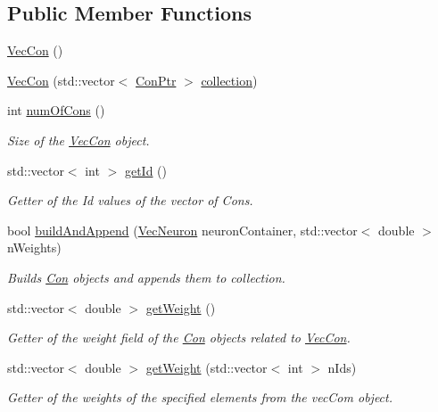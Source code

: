 \subsection*{Public Member Functions}
\begin{DoxyCompactItemize}
\item 
\hyperlink{class_vec_con_afc51866624c1229206e45ed66a08bd44}{VecCon} ()
\item 
\hyperlink{class_vec_con_a0e763a2182acd6f3cd2c1d761e6f6cfc}{VecCon} (std::vector$<$ \hyperlink{_a_m_o_r_e_8h_a169bb8e5f26ce70bf2b10dec2fb5ee50}{ConPtr} $>$ \hyperlink{class_container_a6cc12233bceb7d72709320d2c57e3398}{collection})
\item 
int \hyperlink{class_vec_con_aa9a397520b07fbeead0b6d252c1ea882}{numOfCons} ()
\begin{DoxyCompactList}\small\item\em Size of the \hyperlink{class_vec_con}{VecCon} object. \end{DoxyCompactList}\item 
std::vector$<$ int $>$ \hyperlink{class_vec_con_a03d5dde143e166e68b01c9596573eb5f}{getId} ()
\begin{DoxyCompactList}\small\item\em Getter of the Id values of the vector of Cons. \end{DoxyCompactList}\item 
bool \hyperlink{class_vec_con_a7234c09d040d7114209137176d384566}{buildAndAppend} (\hyperlink{class_vec_neuron}{VecNeuron} neuronContainer, std::vector$<$ double $>$ nWeights)
\begin{DoxyCompactList}\small\item\em Builds \hyperlink{class_con}{Con} objects and appends them to collection. \end{DoxyCompactList}\item 
std::vector$<$ double $>$ \hyperlink{class_vec_con_aafa37c30d566b8784ac84d23a14b5638}{getWeight} ()
\begin{DoxyCompactList}\small\item\em Getter of the weight field of the \hyperlink{class_con}{Con} objects related to \hyperlink{class_vec_con}{VecCon}. \end{DoxyCompactList}\item 
std::vector$<$ double $>$ \hyperlink{class_vec_con_ab9b05c1c3e55cb2994af791bd05dfec0}{getWeight} (std::vector$<$ int $>$ nIds)
\begin{DoxyCompactList}\small\item\em Getter of the weights of the specified elements from the vecCom object. \end{DoxyCompactList}\item 

\end{DoxyCompactItemize}
